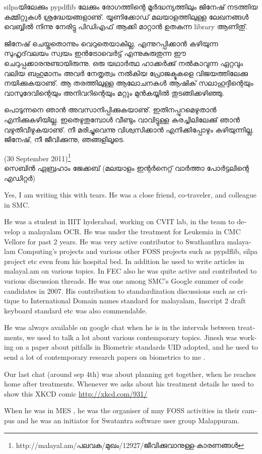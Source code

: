 
silpaയിലേക്കും pypdflib ലേക്കും രോഗത്തിന്റെ മൂര്‍ദ്ധന്യത്തിലും ജിനേഷ് നടത്തിയ കമ്മിറ്റുകള്‍ ശ്രദ്ധേയങ്ങളാണു്. യൂണിക്കോഡ് 
മലയാളത്തിലുള്ള ലേഖനങ്ങള്‍ വെബ്ബില്‍ നിന്നു നേരിട്ടു പിഡിഎഫ് ആക്കി മാറ്റാന്‍ ഉതകുന്ന library ആണിതു്.

ജിനേഷ് ചെയ്തതൊന്നും വെറുതെയാകില്ല, എന്നുറപ്പിക്കാന്‍ കഴിയുന്ന സുഹൃദ്‌വലയം സ്വയം ഇന്‍ട്രോവെര്‍ട്ട് എന്നുകുരുതുന്ന 
ഈ ചെറുപ്പക്കാരനുണ്ടായിരുന്നു. ഒരു യഥാര്‍ത്ഥ ഹാക്കര്‍ക്കു് നല്‍കാവുന്ന ഏറ്റവും വലിയ ബഹുമാനം അവര്‍ നേതൃത്വം 
നല്‍കിയ പ്രോജക്ടുകളെ വിജയത്തിലേക്കു നയിക്കുകയാണു്. ആ തരത്തിലുള്ള ആലോചനകള്‍ ആഷിക്‍ സലാഹുദ്ദീന്റെയും 
വാസുദേവിന്റെയും അനിവറിന്റെയും മറ്റും മുന്‍കയ്യില്‍ തുടങ്ങിക്കഴിഞ്ഞു.

പൊടുന്നനെ ഞാന്‍ അവസാനിപ്പിക്കുകയാണു്. ഇതിനപ്പുറമെഴുതാന്‍ എനിക്കുകഴിയില്ല. ഇതെഴുതുമ്പോള്‍ വീണ്ടും വാവിട്ടുള്ള 
കരച്ചിലിലേക്കു് ഞാന്‍ വഴുതിവീഴുകയാണു്. നീ മരിച്ചുവെന്നു വിശ്വസിക്കാന്‍ എനിക്കിപ്പോഴും കഴിയുന്നില്ല. ജിനേഷ്, നീ ജീവിക്കുന്നു, 
ഞങ്ങളിലൂടെ.

(30  September 2011)\footnote{http://malayal.am/പലവക/മുഖം/12927/ജീവിക്കുവാനുള്ള-കാരണങ്ങള്‍}\\
സെബിന്‍ ഏബ്രഹാം ജേക്കബ് (മലയാളം ഇന്റര്‍നെറ്റ് വാര്‍ത്താ പോര്‍ട്ടലിന്റെ എഡിറ്റര്‍)

\newpage

{\vskip 2pt}
\begin{english}
Yes, I am writing this with tears. He was a close friend,
co-traveler, and colleague in SMC.

He was a student in IIIT hyderabad, working on CVIT lab, in the team
to develop a malayalam OCR. He was under the treatment for Leukemia in
CMC Vellore for past 2 years. He was very active contributor to
Swathanthra malayalam Computing's projects and various other FOSS
projects such as pypdflib, silpa project etc even from his hospital
bed. In addition he used to write articles in malayal.am on various
topics. In FEC also he was quite active and contributed to various
discussion threads. He was one among SMC's  Google summer of code
candidates in 2007. His contribution to standardization discussions
such as critique to International Domain names standard for malayalam,
Inscript 2 draft keyboard standard etc was also commendable.

He was always available on google chat when he is in the intervals
between treatments, we used to talk a lot about various contemporary
topics. Jinesh was working on a paper about pitfalls in Biometric
standards UID adopted, and he used to send a lot of contemporary
research papers on biometrics to me .

Our last chat (around sep 4th) was about planning get together, when
he reaches home after treatments.
Whenever we asks about his treatment details he used to show this XKCD comic
\url{http://xkcd.com/931/}

When he was in MES , he was the organiser of mny FOSS activities in
their campus and he was an initiator for Swatantra software user group
Malappuram.
\end{english}

